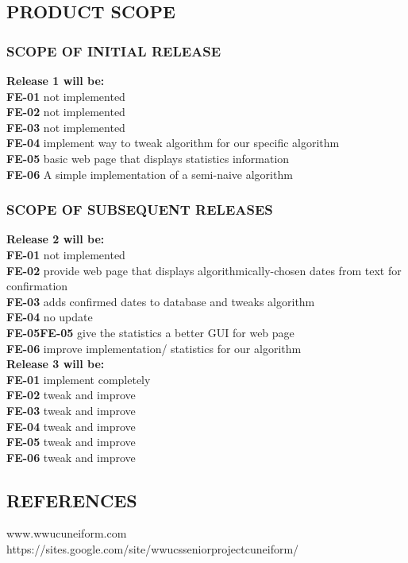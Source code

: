 \documentclass[11pt]{article}
\begin{document}
\subsection{PRODUCT SCOPE}
\subsubsection{SCOPE OF INITIAL RELEASE}
\textbf{Release 1 will be:}\\
\textbf{FE-01} not implemented\\
\textbf{FE-02} not implemented\\
\textbf{FE-03} not implemented\\
\textbf{FE-04} implement way to tweak algorithm for our specific algorithm\\
\textbf{FE-05} basic web page that displays statistics information\\
\textbf{FE-06} A simple implementation of a semi-naive algorithm

\subsubsection{SCOPE OF SUBSEQUENT RELEASES}
\textbf{Release 2 will be:}\\
\textbf{FE-01} not implemented\\
\textbf{FE-02} provide web page that displays algorithmically-chosen dates from text for confirmation\\
\textbf{FE-03} adds confirmed dates to database and tweaks algorithm\\
\textbf{FE-04} no update\\
\textbf{FE-05FE-05} give the statistics a better GUI for web page\\
\textbf{FE-06} improve implementation/ statistics for our algorithm\\

\textbf{Release 3 will be:}\\
\textbf{FE-01} implement completely\\
\textbf{FE-02} tweak and improve\\
\textbf{FE-03 }tweak and improve\\
\textbf{FE-04} tweak and improve\\
\textbf{FE-05}  tweak and improve\\
\textbf{FE-06}  tweak and improve

\subsection{REFERENCES}
www.wwucuneiform.com\\
https://sites.google.com/site/wwucsseniorprojectcuneiform/
\end{document}
